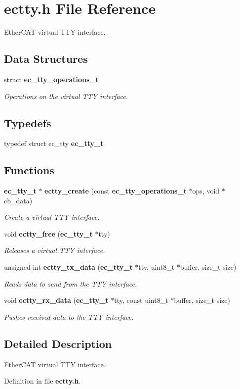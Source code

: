 \section{ectty.\-h File Reference}
\label{ectty_8h}


Ether\-C\-A\-T virtual T\-T\-Y interface.  


\subsection*{Data Structures}
\begin{DoxyCompactItemize}
\item 
struct {\bf ec\-\_\-tty\-\_\-operations\-\_\-t}
\begin{DoxyCompactList}\small\item\em Operations on the virtual T\-T\-Y interface. \end{DoxyCompactList}\end{DoxyCompactItemize}
\subsection*{Typedefs}
\begin{DoxyCompactItemize}
\item 
typedef struct ec\-\_\-tty {\bf ec\-\_\-tty\-\_\-t}
\end{DoxyCompactItemize}
\subsection*{Functions}
\begin{DoxyCompactItemize}
\item 
{\bf ec\-\_\-tty\-\_\-t} $\ast$ {\bf ectty\-\_\-create} (const {\bf ec\-\_\-tty\-\_\-operations\-\_\-t} $\ast$ops, void $\ast$cb\-\_\-data)
\begin{DoxyCompactList}\small\item\em Create a virtual T\-T\-Y interface. \end{DoxyCompactList}\item 
void {\bf ectty\-\_\-free} ({\bf ec\-\_\-tty\-\_\-t} $\ast$tty)
\begin{DoxyCompactList}\small\item\em Releases a virtual T\-T\-Y interface. \end{DoxyCompactList}\item 
unsigned int {\bf ectty\-\_\-tx\-\_\-data} ({\bf ec\-\_\-tty\-\_\-t} $\ast$tty, uint8\-\_\-t $\ast$buffer, size\-\_\-t size)
\begin{DoxyCompactList}\small\item\em Reads data to send from the T\-T\-Y interface. \end{DoxyCompactList}\item 
void {\bf ectty\-\_\-rx\-\_\-data} ({\bf ec\-\_\-tty\-\_\-t} $\ast$tty, const uint8\-\_\-t $\ast$buffer, size\-\_\-t size)
\begin{DoxyCompactList}\small\item\em Pushes received data to the T\-T\-Y interface. \end{DoxyCompactList}\end{DoxyCompactItemize}


\subsection{Detailed Description}
Ether\-C\-A\-T virtual T\-T\-Y interface. 

Definition in file {\bf ectty.\-h}.

